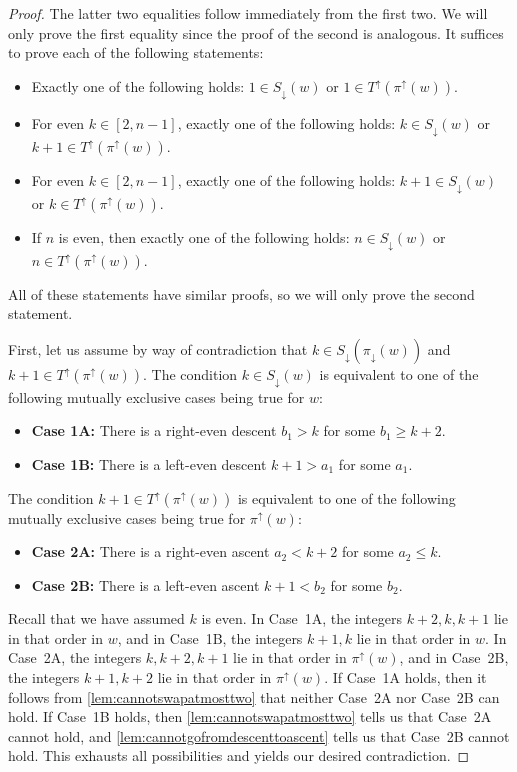 \documentclass[11pt]{amsart}
\theoremstyle{definition}
\begin{document}
\begin{proof}
    The latter two equalities follow immediately from the first two. We will only prove the first equality since the proof of the second is analogous. It suffices to prove each of the following statements:
    \begin{itemize}
        \item Exactly one of the following holds: $1\in S_\downarrow(w)$ or $1\in T^\uparrow(\pi^\uparrow(w))$.
        \item For even $k\in[2,n-1]$, exactly one of the following holds: $k\in S_\downarrow(w)$ or $k+1\in T^\uparrow(\pi^\uparrow(w))$.
        \item For even $k\in[2,n-1]$, exactly one of the following holds: $k+1\in S_\downarrow(w)$ or $k\in T^\uparrow(\pi^\uparrow(w))$.
        \item If $n$ is even, then exactly one of the following holds: $n\in S_\downarrow(w)$ or $n\in T^\uparrow(\pi^\uparrow(w))$.
    \end{itemize}
    All of these statements have similar proofs, so we will only prove the second statement. 
    
    First, let us assume by way of contradiction that $k\in S_\downarrow(\pi_\downarrow(w))$ and $k+1\in T^\uparrow(\pi^\uparrow(w))$. The condition $k\in S_\downarrow(w)$ is equivalent to one of the following mutually exclusive cases being true for $w$:
    
    \begin{itemize}
        \item \textbf{Case 1A: } There is a right-even descent $b_1>k$ for some $b_1\geq k+2$.
        \item \textbf{Case 1B: } There is a left-even descent $k+1>a_1$ for some $a_1$.
    \end{itemize}
    The condition $k+1\in T^\uparrow(\pi^\uparrow(w))$ is equivalent to one of the following mutually exclusive cases being true for $\pi^\uparrow(w)$:
    \begin{itemize}
        \item \textbf{Case 2A: } There is a right-even ascent $a_2<k+2$ for some $a_2\le k$.
        \item \textbf{Case 2B: } There is a left-even ascent $k+1<b_2$ for some $b_2$.
    \end{itemize}
    Recall that we have assumed $k$ is even. In Case~1A, the integers $k+2, k, k+1$ lie in that order in $w$, and in Case~1B, the integers $k+1, k$ lie in that order in $w$. In Case~2A, the integers $k, k+2, k+1$ lie in that order in $\pi^\uparrow(w)$, and in Case~2B, the integers $k+1, k+2$ lie in that order in $\pi^\uparrow(w)$. If Case~1A holds, then it follows from \cref{lem:cannotswapatmosttwo} that neither Case~2A nor Case~2B can hold. If Case~1B holds, then \cref{lem:cannotswapatmosttwo} tells us that Case~2A cannot hold, and  \cref{lem:cannotgofromdescenttoascent} tells us that Case~2B cannot hold. This exhausts all possibilities and yields our desired contradiction.
    

\end{proof}
\end{document}
